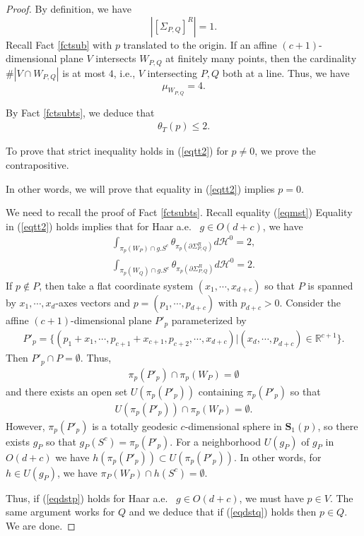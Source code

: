 \documentclass[11pt,a4paper]{amsart}
\numberwithin{equation}{section}
\newcommand{\es}{\emptyset}
\newcommand{\Si}{\Sigma}
\newcommand{\s}{\subset}
\newcommand{\pd}{\partial}
\newcommand{\R}{\mathbb{R}}
\theoremstyle{plain}
\theoremstyle{definition}
\numberwithin{equation}{subsection}
\begin{document}
\begin{proof}
	By definition, we have $$\left|[\Si_{P,Q}]^R\right|=1.$$ Recall Fact \ref{fctsub} with $p$ translated to the origin. If an affine $(c+1)$-dimensional plane $V$ intersects $W_{P,Q}$ at finitely many points, then the cardinality $\#|V\cap W_{P,Q}|$ is at most $4$, i.e., $V$ intersecting $P,Q$ both at a line. Thus, we have $$\mu_{W_{P,Q}}=4.$$
	
	By Fact \ref{fctsubts}, we deduce that	\begin{align}\label{eqtt2}
		\theta_T(p)\le 2.\end{align} 
	
	To prove that strict inequality holds in (\ref{eqtt2}) for $p\not=0$, we prove the contrapositive.
	
	In other words, we will prove that equality in (\ref{eqtt2}) implies $p=0$.
	
	We need to recall the proof of Fact \ref{fctsubts}. Recall equality (\ref{eqmst}) Equality in (\ref{eqtt2}) holds implies that for Haar a.e.~ $g\in O(d+c)$, we have
	\begin{align}
		\label{eqdstp}	\int_{\pi_p(W_P)\cap g.S^c}\theta_{\pi_p\left(\pd \Si^R_{P,Q}\right)}d\mathcal{H}^0=2,\\
		\label{eqdstq}	\int_{\pi_p(W_Q)\cap g.S^c}\theta_{\pi_p\left(\pd \Si^R_{P,Q}\right)}d\mathcal{H}^0=2.
	\end{align}
	If $p\not\in P$, then take a flat coordinate system $(x_1,\cdots,x_{d+c})$ so that $P$ is spanned by $x_1,\cdots,x_d$-axes vectors and $p=(p_1,\cdots,p_{d+c})$ with $p_{d+c}>0.$ Consider the affine $(c+1)$-dimensional plane $P'_p$ parameterized by
	\begin{align*}
		P'_p=\{(p_1+x_1,\cdots,p_{c+1}+x_{c+1},p_{c+2},\cdots,x_{d+c})|(x_d,\cdots,p_{d+c})\in\R^{c+1}\}.
	\end{align*}
	Then $P'_p\cap P=\es.$ Thus, \begin{align*}
		\pi_p(P'_p)\cap \pi_p(W_P)=\es
	\end{align*} and there exists an open set $U(\pi_p(P'_p))$ containing $\pi_p(P'_p)$ so that
	\begin{align*}
		U(\pi_p(P'_p))\cap \pi_p(W_P)=\es.
	\end{align*}  However, $\pi_p(P'_p)$ is a totally geodesic $c$-dimensional sphere in $\mathbf{S}_1(p)$, so there exists $g_P$ so that  $g_P(S^c)=\pi_p(P'_p).$ For a neighborhood $U(g_P)$ of $g_P$ in $O(d+c)$ we have $h(\pi_p(P'_p))\s 	U(\pi_p(P'_p)).$ In other words, for $h\in U(g_P)$, we have $\pi_P(W_P)\cap h(S^c)=\es.$ 
	
	Thus, if (\ref{eqdstp}) holds for Haar a.e.~ $g\in O(d+c)$,  we must have $p\in V.$ The same argument works for $Q$ and we deduce that if (\ref{eqdstq}) holds then $p\in Q.$ We are done.
\end{proof}
\end{document}
